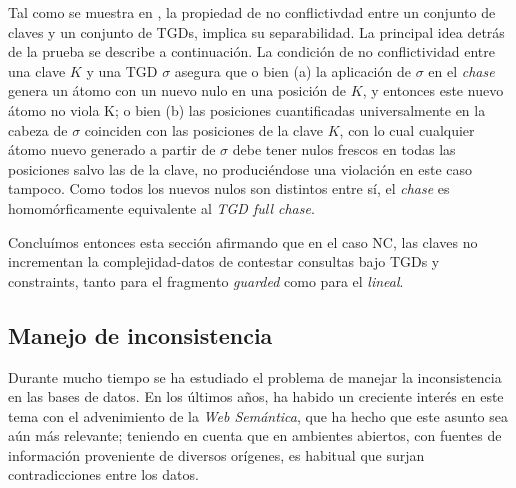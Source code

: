 \documentclass[11pt,a4paper,twoside]{tesis}
\begin{document}
Tal como se muestra en \cite{JWS}, la propiedad de no conflictivdad entre un conjunto de claves y un conjunto de TGDs, implica su separabilidad. La principal idea detrás de la prueba se describe a continuación. La condición de no conflictividad entre una clave $K$ y una TGD $\sigma$ asegura que o bien (a) la aplicación de $\sigma$ en el \textit{chase} genera un átomo con un nuevo nulo en una posición de $K$, y entonces este nuevo átomo no viola K; o bien (b) las posiciones cuantificadas universalmente en la cabeza de $\sigma$ coinciden con las posiciones de la clave $K$, con lo cual cualquier átomo nuevo generado a partir de $\sigma$ debe tener nulos frescos en todas las posiciones salvo las de la clave, no produciéndose una violación en este caso tampoco. Como todos los nuevos nulos son distintos entre sí, el \textit{chase} es homomórficamente equivalente al \textit{TGD full chase}.

Concluímos entonces esta sección afirmando que en el caso NC, las claves no incrementan la complejidad-datos de contestar consultas bajo TGDs y constraints, tanto para el fragmento \textit{guarded} como para el \textit{lineal}.

\subsection{Manejo de inconsistencia}
Durante mucho tiempo se ha estudiado el problema de manejar la inconsistencia en las bases de datos. En los últimos años, ha habido un creciente interés en este tema con el advenimiento de la \textit{Web Semántica}, que ha hecho que este asunto sea aún más relevante; teniendo en cuenta que en ambientes abiertos, con fuentes de información proveniente de diversos orígenes, es habitual que surjan contradicciones entre los datos.
\end{document}
